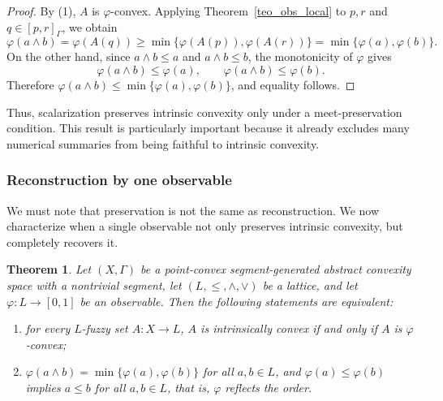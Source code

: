 \documentclass[11pt,a4paper]{article}
\newtheorem{theorem}{Theorem}
\begin{document}
\begin{proof}
By (1), \(A\) is \(\varphi\)-convex. Applying Theorem~\ref{teo_obs_local} to \(p,r\) and \(q\in[p,r]_{\Gamma}\), we obtain
\begin{equation*}
\varphi(a\wedge b)=\varphi(A(q))
\ge
\min\{\varphi(A(p)),\varphi(A(r))\}
=
\min\{\varphi(a),\varphi(b)\}.
\end{equation*}
On the other hand, since \(a\wedge b\le a\) and \(a\wedge b\le b\), the monotonicity of \(\varphi\) gives
\begin{equation*}
\varphi(a\wedge b)\le \varphi(a),
\qquad
\varphi(a\wedge b)\le \varphi(b).
\end{equation*}
Therefore \(\varphi(a\wedge b)\le \min\{\varphi(a),\varphi(b)\}\), and equality follows.
\end{proof}

Thus, scalarization preserves intrinsic convexity only under a meet-preservation condition. This result is particularly important because it already excludes many numerical summaries from being faithful to intrinsic convexity.

\subsubsection{Reconstruction by one observable}

\smallskip

We must note that preservation is not the same as reconstruction. We now characterize when a single observable not only preserves intrinsic convexity, but completely recovers it.

\begin{theorem}\label{teo_single_observable_exact}
Let \((X,\Gamma)\) be a point-convex segment-generated abstract convexity space with a nontrivial segment, let \((L,\leq,\wedge,\vee)\) be a lattice, and let \(\varphi:L\to[0,1]\) be an observable. Then the following statements are equivalent:
\begin{enumerate}
    \item for every \(L\)-fuzzy set \(A:X\to L\), \(A\) is intrinsically convex if and only if \(A\) is \(\varphi\)-convex;
    \item \(\varphi(a\wedge b)=\min\{\varphi(a),\varphi(b)\}\) for all \(a,b\in L\), and \(\varphi(a)\le \varphi(b)\) implies \(a\le b\) for all \(a,b\in L\), that is, \(\varphi\) reflects the order.
\end{enumerate}
\end{theorem}
\end{document}
